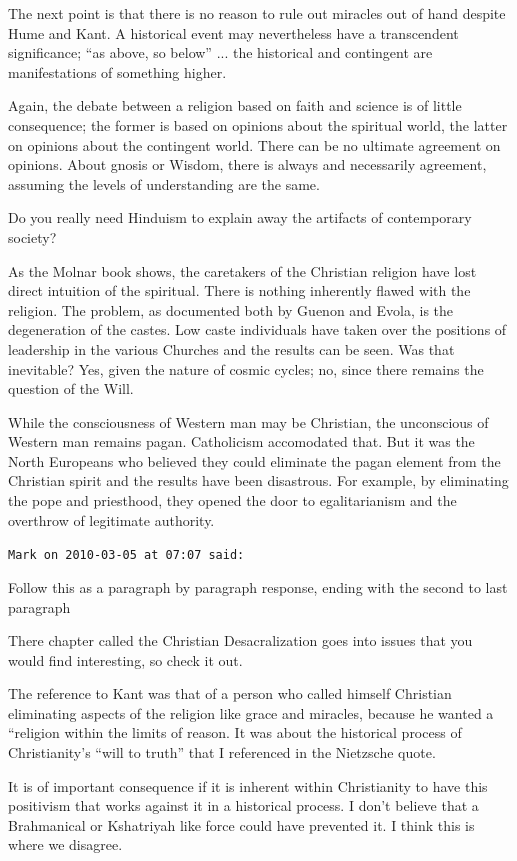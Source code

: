 \begin{footnotesize}
\begin{sffamily}
The next point is that there is no reason to rule out miracles out of hand despite Hume and Kant. A historical event may nevertheless have a transcendent significance; ``as above, so below'' ... the historical and contingent are manifestations of something higher.

Again, the debate between a religion based on faith and science is of little consequence; the former is based on opinions about the spiritual world, the latter on opinions about the contingent world. There can be no ultimate agreement on opinions. About gnosis or Wisdom, there is always and necessarily agreement, assuming the levels of understanding are the same.

Do you really need Hinduism to explain away the artifacts of contemporary society?

As the Molnar book shows, the caretakers of the Christian religion have lost direct intuition of the spiritual. There is nothing inherently flawed with the religion. The problem, as documented both by Guenon and Evola, is the degeneration of the castes. Low caste individuals have taken over the positions of leadership in the various Churches and the results can be seen. Was that inevitable? Yes, given the nature of cosmic cycles; no, since there remains the question of the Will.

While the consciousness of Western man may be Christian, the unconscious of Western man remains pagan. Catholicism accomodated that. But it was the North Europeans who believed they could eliminate the pagan element from the Christian spirit and the results have been disastrous. For example, by eliminating the pope and priesthood, they opened the door to egalitarianism and the overthrow of legitimate authority.

\hfill

\texttt{Mark on 2010-03-05 at 07:07 said:}

Follow this as a paragraph by paragraph response, ending with the second to last paragraph

There chapter called the Christian Desacralization goes into issues that you would find interesting, so check it out.

The reference to Kant was that of a person who called himself Christian eliminating aspects of the religion like grace and miracles, because he wanted a ``religion within the limits of reason. It was about the historical process of Christianity's ``will to truth'' that I referenced in the Nietzsche quote.

It is of important consequence if it is inherent within Christianity to have this positivism that works against it in a historical process. I don't believe that a Brahmanical or Kshatriyah like force could have prevented it. I think this is where we disagree.


\end{sffamily}
\end{footnotesize}
